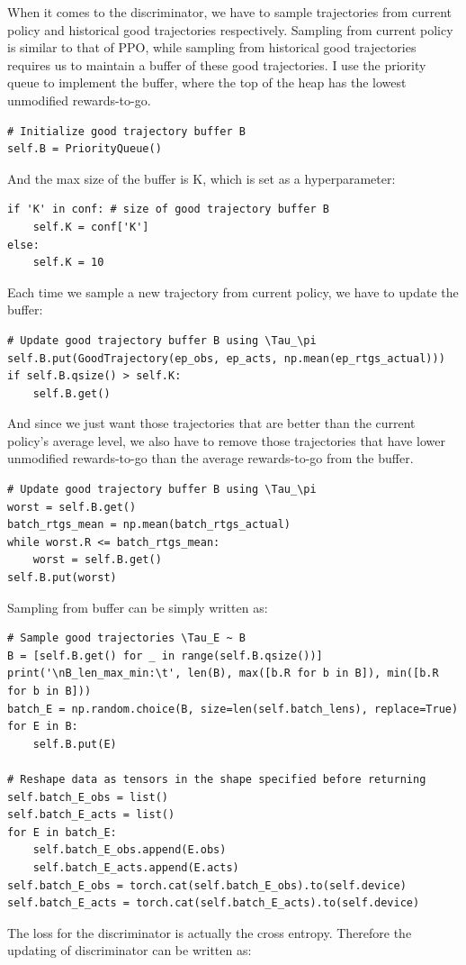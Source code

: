 \documentclass[UTF8, a4paper, 11pt]{article}
\begin{document}
When it comes to the discriminator, we have to sample trajectories from current policy and historical good trajectories respectively. Sampling from current policy is
similar to that of PPO, while sampling from historical good trajectories requires us to maintain a buffer of these good trajectories. I use the priority queue to
implement the buffer, where the top of the heap has the lowest unmodified rewards-to-go.
\begin{lstlisting}
# Initialize good trajectory buffer B
self.B = PriorityQueue()
\end{lstlisting}
And the max size of the buffer is K, which is set as a hyperparameter:
\begin{lstlisting}
if 'K' in conf: # size of good trajectory buffer B
    self.K = conf['K']
else:
    self.K = 10
\end{lstlisting}
Each time we sample a new trajectory from current policy, we have to update the buffer:
\begin{lstlisting}
# Update good trajectory buffer B using \Tau_\pi
self.B.put(GoodTrajectory(ep_obs, ep_acts, np.mean(ep_rtgs_actual)))
if self.B.qsize() > self.K:
    self.B.get()
\end{lstlisting}
And since we just want those trajectories that are better than the current policy's average level, we also have to remove those trajectories that have lower
unmodified rewards-to-go than the average rewards-to-go from the buffer.
\begin{lstlisting}
# Update good trajectory buffer B using \Tau_\pi
worst = self.B.get()
batch_rtgs_mean = np.mean(batch_rtgs_actual)
while worst.R <= batch_rtgs_mean:
    worst = self.B.get()
self.B.put(worst)
\end{lstlisting}
Sampling from buffer can be simply written as:
\begin{lstlisting}
# Sample good trajectories \Tau_E ~ B
B = [self.B.get() for _ in range(self.B.qsize())]
print('\nB_len_max_min:\t', len(B), max([b.R for b in B]), min([b.R for b in B]))
batch_E = np.random.choice(B, size=len(self.batch_lens), replace=True)
for E in B:
    self.B.put(E)

# Reshape data as tensors in the shape specified before returning
self.batch_E_obs = list()
self.batch_E_acts = list()
for E in batch_E:
    self.batch_E_obs.append(E.obs)
    self.batch_E_acts.append(E.acts)
self.batch_E_obs = torch.cat(self.batch_E_obs).to(self.device)
self.batch_E_acts = torch.cat(self.batch_E_acts).to(self.device)
\end{lstlisting}
The loss for the discriminator is actually the cross entropy. Therefore the updating of discriminator can be written as:
\end{document}
